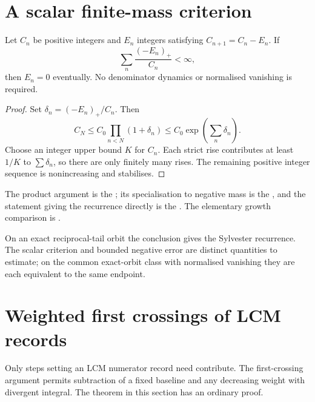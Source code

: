 \documentclass[11pt]{article}
\begin{document}
\section{A scalar finite-mass criterion}\label{sec:mass}
\begin{theorem}\label{res:massscalar}\label{res:mass}
Let $C_n$ be positive integers and $E_n$ integers satisfying
$C_{n+1}=C_n-E_n$. If
\[
 \sum_n\frac{(-E_n)_+}{C_n}<\infty,
\]
then $E_n=0$ eventually. No denominator dynamics or normalised vanishing
is required.
\end{theorem}
\begin{proof}
Set $\delta_n=(-E_n)_+/C_n$. Then
\[
 C_N\le C_0\prod_{n<N}(1+\delta_n)
 \le C_0\exp\!\left(\sum_n\delta_n\right).
\]
Choose an integer upper bound $K$ for $C_n$. Each strict rise contributes
at least $1/K$ to $\sum\delta_n$, so there are only finitely many rises.
The remaining positive integer sequence is nonincreasing and stabilises.
\end{proof}

\noindent The product argument is the
;
its specialisation to negative mass is the
,
and the statement giving the recurrence directly is the
.
The elementary growth comparison is
.

On an exact reciprocal-tail orbit the conclusion gives the Sylvester
recurrence. The scalar criterion and bounded negative error are distinct
quantities to estimate; on the common exact-orbit class with normalised
vanishing they are each equivalent to the same endpoint.

\section{Weighted first crossings of LCM records}\label{sec:lcmrecords}

Only steps setting an LCM numerator record need contribute. The first-crossing
argument permits subtraction of a fixed baseline and any decreasing weight
with divergent integral. The theorem in this section has an ordinary proof.
\end{document}
